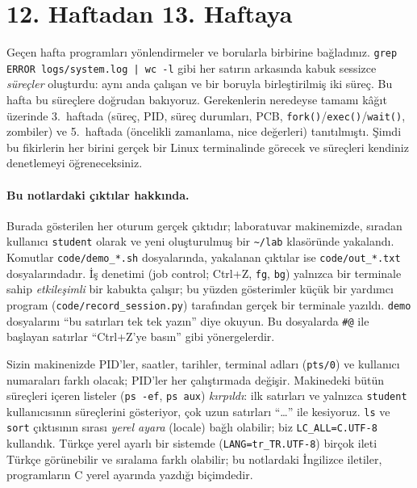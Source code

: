 \documentclass[11pt,a4paper]{article}
\newcommand{\cmd}[1]{\texttt{#1}}
\begin{document}
\setcounter{tocdepth}{1}
\tableofcontents

\section{12. Haftadan 13. Haftaya}

Geçen hafta programları yönlendirmeler ve borularla birbirine bağladınız. \cmd{grep ERROR logs/system.log | wc -l} gibi her satırın arkasında kabuk sessizce \emph{süreçler} oluşturdu: aynı anda çalışan ve bir boruyla birleştirilmiş iki süreç. Bu hafta bu süreçlere doğrudan bakıyoruz. Gerekenlerin neredeyse tamamı kâğıt üzerinde 3.~haftada (süreç, PID, süreç durumları, PCB, \cmd{fork()}/\cmd{exec()}/\cmd{wait()}, zombiler) ve 5.~haftada (öncelikli zamanlama, nice değerleri) tanıtılmıştı. Şimdi bu fikirlerin her birini gerçek bir Linux terminalinde görecek ve süreçleri kendiniz denetlemeyi öğreneceksiniz.

\paragraph{Bu notlardaki çıktılar hakkında.} Burada gösterilen her oturum gerçek çıktıdır; laboratuvar makinemizde, sıradan kullanıcı \texttt{student} olarak ve yeni oluşturulmuş bir \texttt{\textasciitilde/lab} klasöründe yakalandı. Komutlar \texttt{code/demo\_*.sh} dosyalarında, yakalanan çıktılar ise \texttt{code/out\_*.txt} dosyalarındadır. İş denetimi (job control; Ctrl+Z, \cmd{fg}, \cmd{bg}) yalnızca bir terminale sahip \emph{etkileşimli} bir kabukta çalışır; bu yüzden gösterimler küçük bir yardımcı program (\texttt{code/record\_session.py}) tarafından gerçek bir terminale yazıldı. \texttt{demo} dosyalarını ``bu satırları tek tek yazın'' diye okuyun. Bu dosyalarda \texttt{\#@} ile başlayan satırlar ``Ctrl+Z'ye basın'' gibi yönergelerdir.

Sizin makinenizde PID'ler, saatler, tarihler, terminal adları (\texttt{pts/0}) ve kullanıcı numaraları farklı olacak; PID'ler her çalıştırmada değişir. Makinedeki bütün süreçleri içeren listeler (\cmd{ps -ef}, \cmd{ps aux}) \emph{kırpıldı}: ilk satırları ve yalnızca \texttt{student} kullanıcısının süreçlerini gösteriyor, çok uzun satırları ``\dots'' ile kesiyoruz. \cmd{ls} ve \cmd{sort} çıktısının sırası \emph{yerel ayara} (locale) bağlı olabilir; biz \cmd{LC\_ALL=C.UTF-8} kullandık. Türkçe yerel ayarlı bir sistemde (\texttt{LANG=tr\_TR.UTF-8}) birçok ileti Türkçe görünebilir ve sıralama farklı olabilir; bu notlardaki İngilizce iletiler, programların C yerel ayarında yazdığı biçimdedir.
\end{document}
